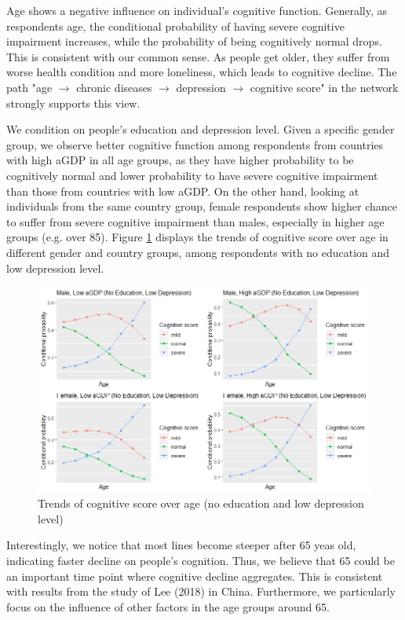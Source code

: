 \documentclass[11pt,twoside]{article}
\numberwithin{Theorem}{section}
\numberwithin{Definition}{section}
\numberwithin{Lemma}{section}
\numberwithin{Algorithm}{section}
\numberwithin{equation}{section}
\begin{document}
Age shows a negative influence on individual's cognitive function. Generally, as respondents age, the conditional probability of having severe cognitive impairment increases, while the probability of being cognitively normal drops. This is consistent with our common sense. As people get older, they suffer from worse health condition and more loneliness, which leads to cognitive decline. The path "age $\rightarrow$ chronic diseases $\rightarrow$ depression $\rightarrow$ cognitive score" in the network strongly supports this view. 

We condition on people's education and depression level. Given a specific gender group, we observe better cognitive function among respondents from countries with high aGDP in all age groups, as they have higher probability to be cognitively normal and lower probability to have severe cognitive impairment than those from countries with low aGDP. On the other hand, looking at individuals from the same country group, female respondents show higher chance to suffer from severe cognitive impairment than males, especially in higher age groups (e.g. over 85). Figure \ref{fig:age1} displays the trends of cognitive score over age in different gender and country groups, among respondents with no education and low depression level.

\begin{figure}[!h]
	\centering
	\includegraphics[width = 0.85 \textwidth]{Images/age1.png}
	\caption{Trends of cognitive score over age (no education and low depression level)}
	\label{fig:age1}
\end{figure}

Interestingly, we notice that most lines become steeper after 65 yeas old, indicating faster decline on people's cognition. Thus, we believe that 65 could be an important time point where cognitive decline aggregates. This is consistent with results from the study of Lee (2018) \cite{lee2018association} in China. Furthermore, we particularly focus on the influence of other factors in the age groups around 65.
\end{document}
